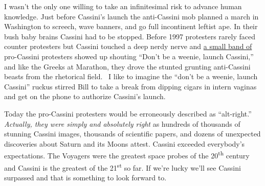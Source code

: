 I wasn't the only one willing to take an infinitesimal risk to advance
human knowledge. Just before Cassini's launch the anti-Cassini mob
planned a march in Washington to screech, wave banners, and go full
incontinent leftist ape. In their bush baby brains Cassini had to be
stopped. Before 1997 protesters rarely faced counter protesters but
Cassini touched a deep nerdy nerve and
\href{http://www.animatedsoftware.com/cassini/nltrs/nltr0050.htm}{a
small band of} pro-Cassini protesters showed up shouting ``Don't be a
weenie, launch Cassini,'' and like the Greeks at Marathon, they drove
the stunted grunting anti-Cassini beasts from the rhetorical field. ~I
like to imagine the ``don't be a weenie, launch Cassini'' ruckus stirred
Bill to take a break from dipping cigars in intern vaginas and get on
the phone to authorize Cassini's launch.

Today the pro-Cassini protesters would be erroneously described as
``alt-right.'' \emph{Actually, they were simply and absolutely right} as
hundreds of thousands of stunning Cassini images, thousands of
scientific papers, and dozens of unexpected discoveries about Saturn and
its Moons attest. Cassini exceeded everybody's expectations. The
Voyagers were the greatest space probes of the 20\textsuperscript{th}
century and Cassini is the greatest of the 21\textsuperscript{st} so
far. If we're lucky we'll see Cassini surpassed and that is something
to look forward to.



%
 

